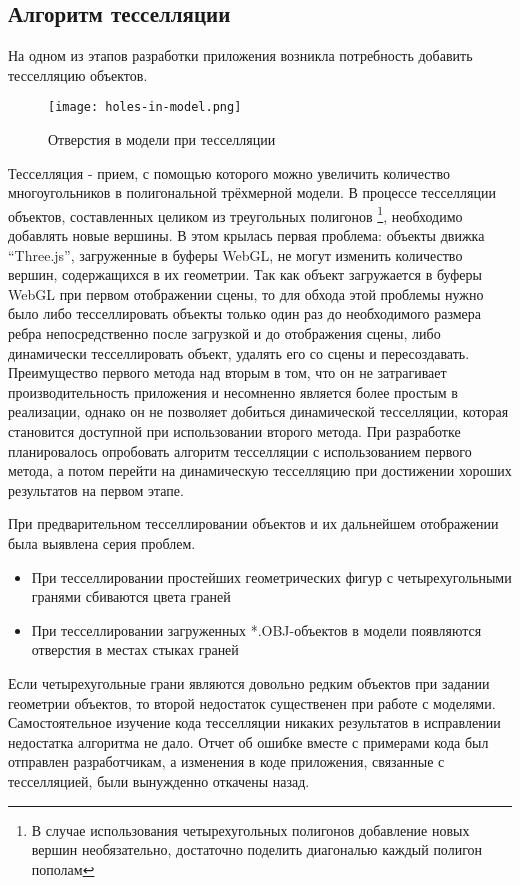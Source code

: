 \subsection{Алгоритм тесселляции}
На одном из этапов разработки приложения возникла потребность добавить
тесселляцию объектов.

\begin{figure}[htb]
\centering
\texttt{[image: holes-in-model.png]}
\caption{Отверстия в модели при тесселляции}
\label{fig:holes-in-model}
\end{figure}

Тесселляция - прием, с помощью которого можно увеличить количество
многоугольников в полигональной трёхмерной модели. В процессе тесселляции
объектов, составленных целиком из треугольных полигонов \footnote{В случае
использования четырехугольных полигонов добавление новых вершин необязательно,
достаточно поделить диагональю каждый полигон пополам}, необходимо добавлять
новые вершины. В этом крылась первая проблема: объекты движка ``Three.js'',
загруженные в буферы WebGL, не могут изменить количество вершин, содержащихся в
их геометрии. Так как объект загружается в буферы WebGL при первом отображении
сцены, то для обхода этой проблемы нужно было либо тесселлировать объекты только
один раз до необходимого размера ребра непосредственно после загрузкой и до
отображения сцены, либо динамически тесселлировать объект, удалять его со сцены
и пересоздавать. Преимущество первого метода над вторым в том, что он не
затрагивает производительность приложения и несомненно является более простым в
реализации, однако он не позволяет добиться динамической тесселляции, которая
становится доступной при использовании второго метода. При разработке
планировалось опробовать алгоритм тесселляции с использованием первого метода, а
потом перейти на динамическую тесселляцию при достижении хороших результатов на
первом этапе.

При предварительном тесселлировании объектов и их дальнейшем отображении была
выявлена серия проблем.

\begin{itemize}
    \item При тесселлировании простейших геометрических фигур с четырехугольными
    гранями сбиваются цвета граней
    \item При тесселлировании загруженных *.OBJ-объектов в модели появляются
    отверстия в местах стыках граней
\end{itemize}

Если четырехугольные грани являются довольно редким объектов при задании
геометрии объектов, то второй недостаток существенен при работе с моделями.
Самостоятельное изучение кода тесселляции никаких результатов в
исправлении недостатка алгоритма не дало. Отчет об ошибке вместе с примерами
кода был отправлен разработчикам, а изменения в коде приложения,
связанные с тесселляцией, были вынужденно откачены назад.

